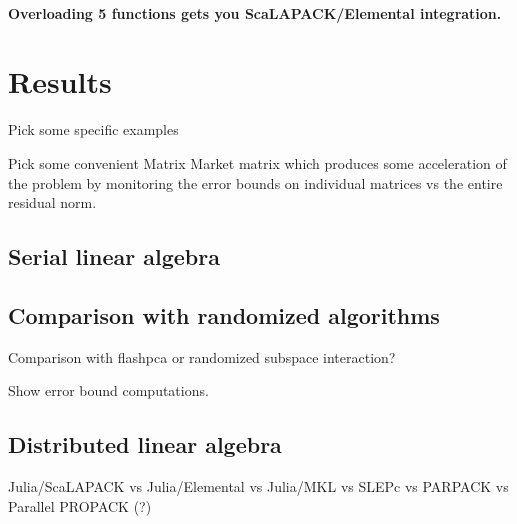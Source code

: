 \documentclass[final,leqno]{siamltex1213}
\begin{document}
\paragraph{Overloading 5 functions gets you ScaLAPACK/Elemental integration.}




\section{Results}

Pick some specific examples

Pick some convenient Matrix Market matrix which produces some acceleration of
the problem by monitoring the error bounds on individual matrices vs the entire
residual norm.




\subsection{Serial linear algebra}





\subsection{Comparison with randomized algorithms}

Comparison with flashpca or randomized subspace interaction?

Show error bound computations.




\subsection{Distributed linear algebra}



Julia/ScaLAPACK vs Julia/Elemental vs Julia/MKL vs SLEPc vs PARPACK vs Parallel PROPACK (?)
\end{document}

